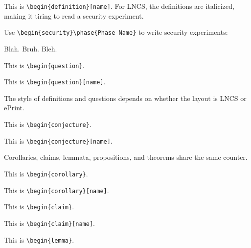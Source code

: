 \begin{definition}[name]
This is \texttt{\textbackslash begin\{definition\}[name]}.
For LNCS, the definitions are italicized,
making it tiring to read a security experiment.

Use \texttt{\textbackslash begin\{security\}\textbackslash phase\{Phase Name\}}
to write security experiments:
\begin{security}
 Blah.
 Bruh.
 Bleh.
\end{security}
\end{definition}

\begin{question}
This is \texttt{\textbackslash begin\{question\}}.
\end{question}

\begin{question}[name]
This is \texttt{\textbackslash begin\{question\}[name]}.
\end{question}

\noindent
The style of definitions and questions depends on
whether the layout is LNCS or ePrint.

\begin{conjecture}
This is \texttt{\textbackslash begin\{conjecture\}}.
\end{conjecture}

\begin{conjecture}[name]
This is \texttt{\textbackslash begin\{conjecture\}[name]}.
\end{conjecture}

\noindent
Corollaries, claims, lemmata, propositions, and theorems
share the same counter.

\begin{corollary}
This is \texttt{\textbackslash begin\{corollary\}}.
\end{corollary}

\begin{corollary}[name]
This is \texttt{\textbackslash begin\{corollary\}[name]}.
\end{corollary}

\begin{claim}
This is \texttt{\textbackslash begin\{claim\}}.
\end{claim}

\begin{claim}[name]
This is \texttt{\textbackslash begin\{claim\}[name]}.
\end{claim}

\begin{lemma}\label{lem:lemma5}
This is \texttt{\textbackslash begin\{lemma\}}.
\end{lemma}


